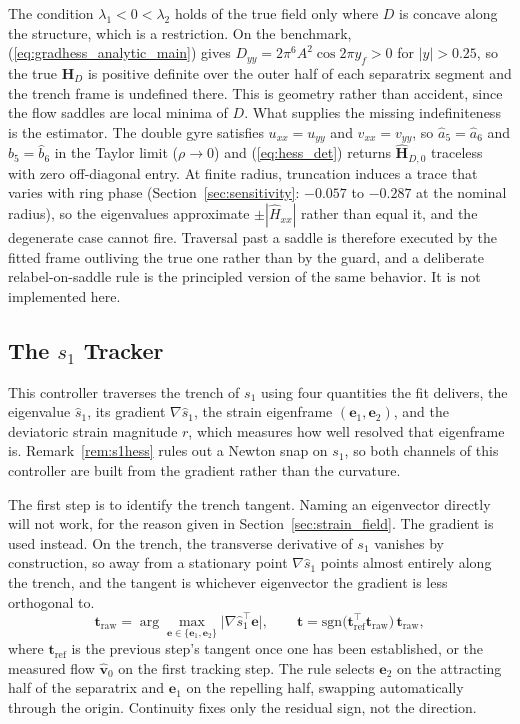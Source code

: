\documentclass[lettersize,journal]{IEEEtran}
\begin{document}
The condition $\lambda_1 < 0 < \lambda_2$ holds of the true field only
where $D$ is concave along the structure, which is a restriction. On the
benchmark, (\ref{eq:gradhess_analytic_main}) gives $D_{yy} = 2\pi^6
A^2\cos 2\pi y_f > 0$ for $|y| > 0.25$, so the true $\mathbf{H}_D$ is
positive definite over the outer half of each separatrix segment and the
trench frame is undefined there. This is geometry rather than accident,
since the flow saddles are local minima of $D$. What supplies the
missing indefiniteness is the estimator. The double gyre satisfies
$u_{xx} = u_{yy}$ and $v_{xx} = v_{yy}$, so $\hat{a}_5 = \hat{a}_6$ and
$\hat{b}_5 = \hat{b}_6$ in the Taylor limit ($\rho \to 0$) and (\ref{eq:hess_det})
returns $\hat{\mathbf{H}}_{D,0}$ traceless with zero off-diagonal entry. At finite radius, truncation induces a trace that varies with ring phase
(Section~\ref{sec:sensitivity}: $-0.057$ to $-0.287$ at the nominal
radius), so the eigenvalues approximate $\pm|\hat{H}_{xx}|$ rather than
equal it, and the degenerate
case cannot fire. Traversal past a saddle is therefore executed by the
fitted frame outliving the true one rather than by the guard, and a
deliberate relabel-on-saddle rule is the principled version of the same
behavior. It is not implemented here.




\subsection{The $s_1$ Tracker}


This controller traverses the trench of $s_1$ using four quantities the
fit delivers, the eigenvalue $\hat{s}_1$, its gradient
$\nabla\hat{s}_1$, the strain eigenframe $(\mathbf{e}_1, \mathbf{e}_2)$,
and the deviatoric strain magnitude $r$, which measures how well resolved
that eigenframe is. Remark~\ref{rem:s1hess} rules out a Newton snap on
$s_1$, so both
channels of this controller are built from the gradient rather than the
curvature.

The first step is to identify the trench tangent. Naming an eigenvector
directly will not work, for the reason given in
Section~\ref{sec:strain_field}. The gradient is used instead. On the
trench, the transverse derivative of $s_1$ vanishes by construction, so
away from a stationary point $\nabla\hat{s}_1$ points almost entirely
along the trench, and the tangent is whichever eigenvector the gradient
is less orthogonal to.
\begin{equation}
    \mathbf{t}_{\mathrm{raw}} =
    \arg\max_{\mathbf{e} \in \{\mathbf{e}_1, \mathbf{e}_2\}}
    \bigl\lvert \nabla\hat{s}_1^\top \mathbf{e} \bigr\rvert,
    \qquad
    \mathbf{t} = \mathrm{sgn}\bigl(\mathbf{t}_{\mathrm{ref}}^\top
    \mathbf{t}_{\mathrm{raw}}\bigr)\,\mathbf{t}_{\mathrm{raw}},
    \label{eq:tangent_select}
\end{equation}
where $\mathbf{t}_{\mathrm{ref}}$ is the previous step's tangent once one
has been established, or the measured flow $\hat{\mathbf{v}}_0$ on the
first tracking step. The rule selects $\mathbf{e}_2$ on the attracting
half of the separatrix and $\mathbf{e}_1$ on the repelling half, swapping
automatically through the origin. Continuity fixes only the residual
sign, not the direction.
\end{document}
